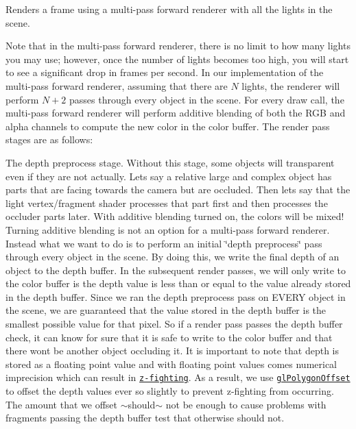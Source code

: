 Renders a frame using a multi-\/pass forward renderer with all the lights in the scene.

Note that in the multi-\/pass forward renderer, there is no limit to how many lights you may use; however, once the number of lights becomes too high, you will start to see a significant drop in frames per second. In our implementation of the multi-\/pass forward renderer, assuming that there are $N$ lights, the renderer will perform $ N + 2 $ passes through every object in the scene. For every draw call, the multi-\/pass forward renderer will perform additive blending of both the R\+GB and alpha channels to compute the new color in the color buffer. The render pass stages are as follows\+:


\begin{DoxyEnumerate}
\item The depth preprocess stage. Without this stage, some objects will transparent even if they are not actually. Let\textquotesingle{}s say a relative large and complex object has parts that are facing towards the camera but are occluded. Then let\textquotesingle{}s say that the light vertex/fragment shader processes that part first and then processes the occluder parts later. With additive blending turned on, the colors will be mixed! Turning additive blending is not an option for a multi-\/pass forward renderer. Instead what we want to do is to perform an initial \char`\"{}depth preprocess\char`\"{} pass through every object in the scene. By doing this, we write the final depth of an object to the depth buffer. In the subsequent render passes, we will only write to the color buffer is the depth value is less than or equal to the value already stored in the depth buffer. Since we ran the depth preprocess pass on E\+V\+E\+RY object in the scene, we are guaranteed that the value stored in the depth buffer is the smallest possible value for that pixel. So if a render pass passes the depth buffer check, it can know for sure that it is safe to write to the color buffer and that there won\textquotesingle{}t be another object occluding it. It is important to note that depth is stored as a floating point value and with floating point values comes numerical imprecision which can result in \href{https://en.wikipedia.org/wiki/Z-fighting}{\tt z-\/fighting}. As a result, we use \href{https://www.opengl.org/sdk/docs/man/html/glPolygonOffset.xhtml}{\tt gl\+Polygon\+Offset} to offset the depth values ever so slightly to prevent z-\/fighting from occurring. The amount that we offset $\sim$should$\sim$ not be enough to cause problems with fragments passing the depth buffer test that otherwise should not.

\end{DoxyEnumerate}
